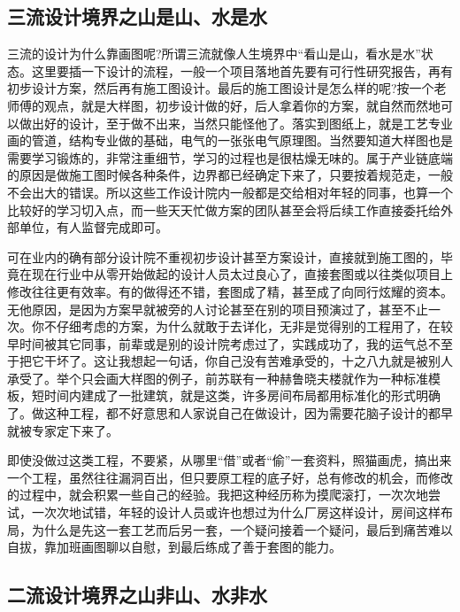 \documentclass[
]{book}
\begin{document}
\hypertarget{ux4e09ux6d41ux8bbeux8ba1ux5883ux754cux4e4bux5c71ux662fux5c71ux6c34ux662fux6c34}{%
\subsection{三流设计境界之山是山、水是水}\label{ux4e09ux6d41ux8bbeux8ba1ux5883ux754cux4e4bux5c71ux662fux5c71ux6c34ux662fux6c34}}

三流的设计为什么靠画图呢?所谓三流就像人生境界中``看山是山，看水是水''状态。这里要插一下设计的流程，一般一个项目落地首先要有可行性研究报告，再有初步设计方案，然后再有施工图设计。最后的施工图设计是怎么样的呢?按一个老师傅的观点，就是大样图，初步设计做的好，后人拿着你的方案，就自然而然地可以做出好的设计，至于做不出来，当然只能怪他了。落实到图纸上，就是工艺专业画的管道，结构专业做的基础，电气的一张张电气原理图。当然要知道大样图也是需要学习锻炼的，非常注重细节，学习的过程也是很枯燥无味的。属于产业链底端的原因是做施工图时候各种条件，边界都已经确定下来了，只要按着规范走，一般不会出大的错误。所以这些工作设计院内一般都是交给相对年轻的同事，也算一个比较好的学习切入点，而一些天天忙做方案的团队甚至会将后续工作直接委托给外部单位，有人监督完成即可。

可在业内的确有部分设计院不重视初步设计甚至方案设计，直接就到施工图的，毕竟在现在行业中从零开始做起的设计人员太过良心了，直接套图或以往类似项目上修改往往更有效率。有的做得还不错，套图成了精，甚至成了向同行炫耀的资本。无他原因，是因为方案早就被旁的人讨论甚至在别的项目预演过了，甚至不止一次。你不仔细考虑的方案，为什么就敢于去详化，无非是觉得别的工程用了，在较早时间被其它同事，前辈或是别的设计院考虑过了，实践成功了，我的运气总不至于把它干坏了。这让我想起一句话，你自己没有苦难承受的，十之八九就是被别人承受了。举个只会画大样图的例子，前苏联有一种赫鲁晓夫楼就作为一种标准模板，短时间内建成了一批建筑，就是这类，许多房间布局都用标准化的形式明确了。做这种工程，都不好意思和人家说自己在做设计，因为需要花脑子设计的都早就被专家定下来了。

即使没做过这类工程，不要紧，从哪里``借''或者``偷''一套资料，照猫画虎，搞出来一个工程，虽然往往漏洞百出，但只要原工程的底子好，总有修改的机会，而修改的过程中，就会积累一些自己的经验。我把这种经历称为摸爬滚打，一次次地尝试，一次次地试错，年轻的设计人员或许也想过为什么厂房这样设计，房间这样布局，为什么是先这一套工艺而后另一套，一个疑问接着一个疑问，最后到痛苦难以自拔，靠加班画图聊以自慰，到最后练成了善于套图的能力。

\hypertarget{ux4e8cux6d41ux8bbeux8ba1ux5883ux754cux4e4bux5c71ux975eux5c71ux6c34ux975eux6c34}{%
\subsection{二流设计境界之山非山、水非水}\label{ux4e8cux6d41ux8bbeux8ba1ux5883ux754cux4e4bux5c71ux975eux5c71ux6c34ux975eux6c34}}
\end{document}
